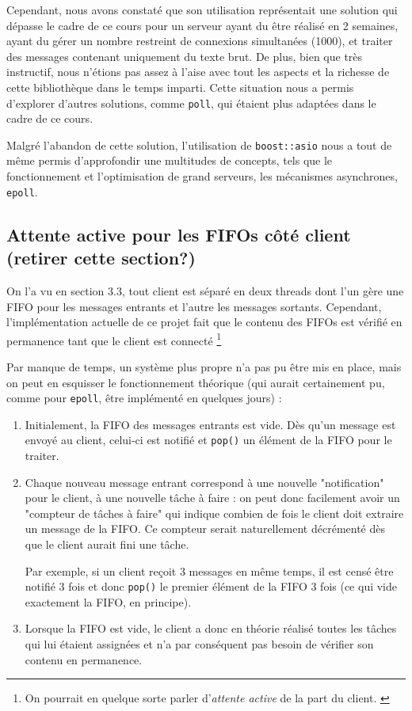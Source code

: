 \documentclass{article}
\begin{document}
\noindent Cependant, nous avons constaté que son utilisation représentait une solution qui dépasse le cadre de ce cours pour un serveur ayant du être réalisé en 2 semaines, ayant du gérer un nombre restreint de connexions simultanées (1000), et traiter des messages contenant uniquement du texte brut. De plus, bien que très instructif, nous n’étions pas assez à l’aise avec tout les aspects et la richesse de cette bibliothèque dans le temps imparti. Cette situation nous a permis d'explorer d’autres solutions, comme \texttt{poll}, qui étaient plus adaptées dans le cadre de ce cours.

\noindent Malgré l'abandon de cette solution, l’utilisation de \texttt{boost::asio} nous a tout de même permis d'approfondir une multitudes de concepts, tels que le fonctionnement et l'optimisation de grand serveurs, les mécanismes asynchrones, \texttt{epoll}.


\subsection{Attente active pour les FIFOs côté client (retirer cette section?)}
\noindent On l'a vu en section 3.3, tout client est séparé en deux threads dont l'un gère une FIFO pour les messages entrants et l'autre les messages sortants. Cependant, l'implémentation actuelle de ce projet fait que le contenu des FIFOs est vérifié en permanence tant que le client est connecté \footnote{On pourrait en quelque sorte parler d'\textit{attente active} de la part du client. \cite{Attente Active} }

\noindent Par manque de temps, un système plus propre n'a pas pu être mis en place, mais on peut en esquisser le fonctionnement théorique (qui aurait certainement pu, comme pour \texttt{epoll}, être implémenté en quelques jours) :
\begin{enumerate}
    \item Initialement, la FIFO des messages entrants est vide. Dès qu'un message est envoyé au client, celui-ci est notifié et \texttt{pop()} un élément de la FIFO pour le traiter.
    \item Chaque nouveau message entrant correspond à une nouvelle "notification" pour le client, à une nouvelle tâche à faire : on peut donc facilement avoir un "compteur de tâches à faire" qui indique combien de fois le client doit extraire un message de la FIFO. Ce compteur serait naturellement décrémenté dès que le client aurait fini une tâche.

    Par exemple, si un client reçoit 3 messages en même temps, il est censé être notifié 3 fois et donc \texttt{pop()} le premier élément de la FIFO 3 fois (ce qui vide exactement la FIFO, en principe).
    \item Lorsque la FIFO est vide, le client a donc en théorie réalisé toutes les tâches qui lui étaient assignées et n'a par conséquent pas besoin de vérifier son contenu en permanence.
\end{enumerate}
\end{document}
